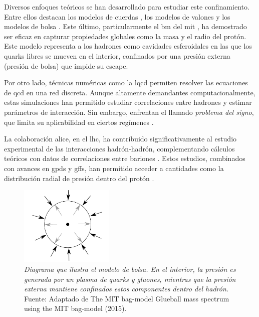 Diversos enfoques teóricos se han desarrollado para estudiar este confinamiento. Entre ellos destacan los modelos de cuerdas \cite{Artru1974,Andersson_1983}, los modelos de valones \cite{Hwa_1981} y los modelos de bolsa \cite{AIHPA_1968__8_2_163_0,DeTar_1983}. Este último, particularmente el \gls{bm} del \gls{mit} \cite{Chodos_1974,Chodos1974a}, ha demostrado ser eficaz en capturar propiedades globales como la masa y el radio del protón. Este modelo representa a los hadrones como cavidades esferoidales en las que los quarks libres se mueven en el interior, confinados por una presión externa (presión de bolsa) que impide su escape.

Por otro lado, técnicas numéricas como la \gls{lqcd} permiten resolver las ecuaciones de \gls{qcd} en una red discreta. Aunque altamente demandantes computacionalmente, estas simulaciones han permitido estudiar correlaciones entre hadrones y estimar parámetros de interacción. Sin embargo, enfrentan el llamado \emph{problema del signo}, que limita su aplicabilidad en ciertos regímenes \cite{Iritani_2019,Hatsuda_2017}.

La colaboración \gls{alice}, en el \gls{lhc}, ha contribuido significativamente al estudio experimental de las interacciones hadrón-hadrón, complementando cálculos teóricos con datos de correlaciones entre bariones \cite{Collaboration1984,Collaboration2020,Collaboration2021}. Estos estudios, combinados con avances en \glspl{gpd} y \glspl{gff}, han permitido acceder a cantidades como la distribución radial de presión dentro del protón \cite{Burkert_2018}.

\begin{figure}
    \centering
    \includegraphics[width=0.4\textwidth]{./Images/Bag model.png}
    \caption[Diagrama de bolsa]{\emph{Diagrama que ilustra el modelo de bolsa. En el interior, la presión es generada por un plasma de quarks y gluones, mientras que la presión externa mantiene confinados estos componentes dentro del hadrón.} Fuente: Adaptado de The MIT bag-model Glueball mass spectrum using the MIT bag-model (2015).}
    \label{fig:Bolsa }
\end{figure}

